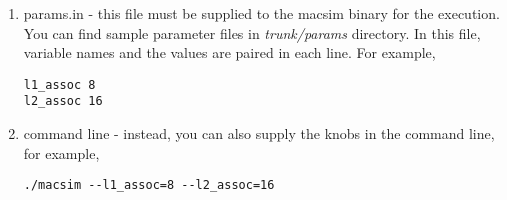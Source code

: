 \begin{enumerate}
  \item params.in - this file must be supplied to the macsim binary
  for the execution. You can find sample parameter files
  in \textit{trunk/params} directory. In this file, variable names and
  the values are paired in each line. For example,

\smallskip
\begin{lstlisting}
l1_assoc 8
l2_assoc 16
\end{lstlisting}
\smallskip


  \item command line - instead, you can also supply the knobs in the command line, for example,

\smallskip
\begin{lstlisting}
./macsim --l1_assoc=8 --l2_assoc=16
\end{lstlisting}
\smallskip

\end{enumerate}


